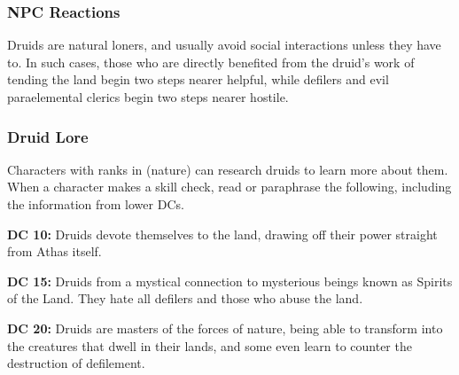 \subsubsection{NPC Reactions}

Druids are natural loners, and usually avoid social interactions unless they have to. In such cases, those who are directly benefited from the druid's work of tending the land begin two steps nearer helpful, while defilers and evil paraelemental clerics begin two steps nearer hostile.

\subsubsection{Druid Lore}

Characters with ranks in  (nature) can research druids to learn more about them. When a character makes a skill check, read or paraphrase the following, including the information from lower DCs.

\textbf{DC 10:} Druids devote themselves to the land, drawing off their power straight from Athas itself.

\textbf{DC 15:} Druids from a mystical connection to mysterious beings known as Spirits of the Land. They hate all defilers and those who abuse the land.

\textbf{DC 20:} Druids are masters of the forces of nature, being able to transform into the creatures that dwell in their lands, and some even learn to counter the destruction of defilement.
